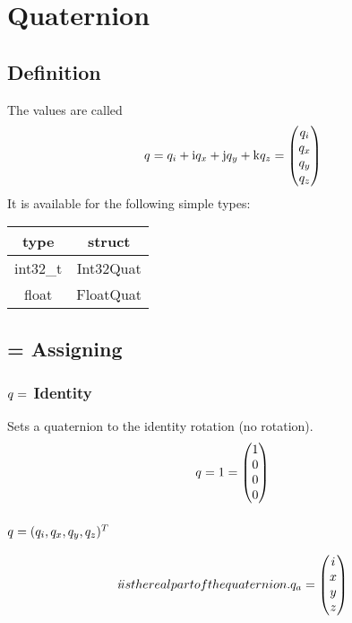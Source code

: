 \section{Quaternion}
\subsection{Definition}
The values are called
\begin{equation}
q_{} = q_i + \mathrm{i} q_x + \mathrm{j} q_y + \mathrm{k} q_z
 = \begin{pmatrix} q_i \\q_x\\q_y\\q_z\end{pmatrix}
\end{equation}
It is available for the following simple types:\\
\begin{tabular}{c|c}
type		& struct		\\ \hline
int32\_t	& Int32Quat		\\
float		& FloatQuat
\end{tabular}




\subsection{= Assigning}
\subsubsection*{$q_{} = $ Identity}
Sets a quaternion to the identity rotation (no rotation).
\begin{equation}
q_{} = 1 = \begin{pmatrix}1 \\ 0 \\0\\0\end{pmatrix}
\end{equation}

\subsubsection*{$q_{} = (q_{i},q_{x},q_{y},q_{z})^{T}$}
\begin{equation}
\textit{i} is the real part of the quaternion.
 q_{a} = \begin{pmatrix}i\\ x \\ y \\ z \end{pmatrix}
\end{equation}

